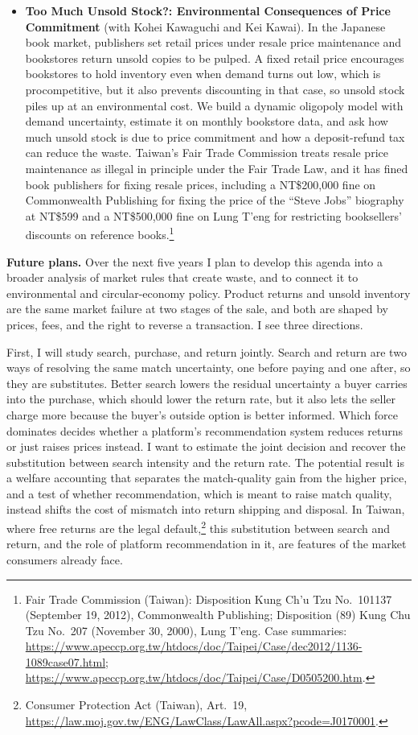 \documentclass[11pt,letterpaper]{article}
\begin{document}
\begin{itemize}[leftmargin=1.6em,itemsep=0.2em,topsep=0.1em,parsep=0.1em]
\item \textbf{Too Much Unsold Stock?: Environmental Consequences of Price Commitment} (with Kohei Kawaguchi and Kei Kawai). In the Japanese book market, publishers set retail prices under resale price maintenance and bookstores return unsold copies to be pulped. A fixed retail price encourages bookstores to hold inventory even when demand turns out low, which is procompetitive, but it also prevents discounting in that case, so unsold stock piles up at an environmental cost. We build a dynamic oligopoly model with demand uncertainty, estimate it on monthly bookstore data, and ask how much unsold stock is due to price commitment and how a deposit-refund tax can reduce the waste. Taiwan's Fair Trade Commission treats resale price maintenance as illegal in principle under the Fair Trade Law, and it has fined book publishers for fixing resale prices, including a NT\$200,000 fine on Commonwealth Publishing for fixing the price of the ``Steve Jobs'' biography at NT\$599 and a NT\$500,000 fine on Lung T'eng for restricting booksellers' discounts on reference books.\footnote{Fair Trade Commission (Taiwan): Disposition Kung Ch'u Tzu No.~101137 (September 19, 2012), Commonwealth Publishing; Disposition (89) Kung Chu Tzu No.~207 (November 30, 2000), Lung T'eng. Case summaries: \url{https://www.apeccp.org.tw/htdocs/doc/Taipei/Case/dec2012/1136-1089case07.html}; \url{https://www.apeccp.org.tw/htdocs/doc/Taipei/Case/D0505200.htm}.}
\end{itemize}

\medskip
\noindent\textbf{Future plans.} Over the next five years I plan to develop this agenda into a broader analysis of market rules that create waste, and to connect it to environmental and circular-economy policy. Product returns and unsold inventory are the same market failure at two stages of the sale, and both are shaped by prices, fees, and the right to reverse a transaction. I see three directions.

First, I will study search, purchase, and return jointly. Search and return are two ways of resolving the same match uncertainty, one before paying and one after, so they are substitutes. Better search lowers the residual uncertainty a buyer carries into the purchase, which should lower the return rate, but it also lets the seller charge more because the buyer's outside option is better informed. Which force dominates decides whether a platform's recommendation system reduces returns or just raises prices instead. I want to estimate the joint decision and recover the substitution between search intensity and the return rate. The potential result is a welfare accounting that separates the match-quality gain from the higher price, and a test of whether recommendation, which is meant to raise match quality, instead shifts the cost of mismatch into return shipping and disposal. In Taiwan, where free returns are the legal default,\footnote{Consumer Protection Act (Taiwan), Art.~19, \url{https://law.moj.gov.tw/ENG/LawClass/LawAll.aspx?pcode=J0170001}.} this substitution between search and return, and the role of platform recommendation in it, are features of the market consumers already face.
\end{document}
